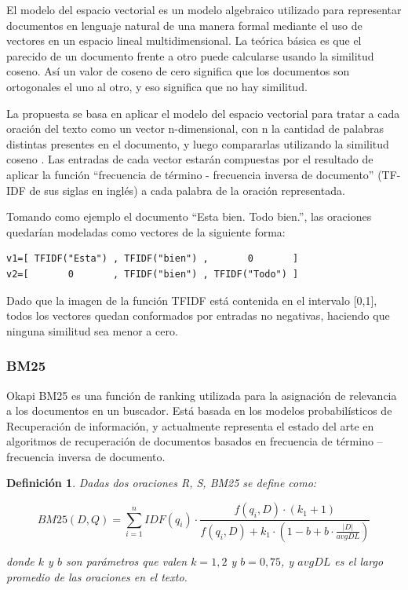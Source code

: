 \documentclass[a4paper]{article}
\newtheorem{definicion}{Definición}
\begin{document}
El modelo del espacio vectorial es un modelo algebraico utilizado para representar documentos en lenguaje natural de una manera formal mediante el uso de vectores en un espacio lineal multidimensional. La teórica básica es que el parecido de un documento frente a otro puede calcularse usando la similitud coseno. Así un valor de coseno de cero significa que los documentos son ortogonales el uno al otro, y eso significa que no hay similitud.

La propuesta se basa en aplicar el modelo del espacio vectorial para tratar a cada oración del texto como un vector n-dimensional, con n la cantidad de palabras distintas presentes en el documento, y luego compararlas utilizando la similitud coseno . Las entradas de cada vector estarán compuestas por el resultado de aplicar la función “frecuencia de término - frecuencia inversa de documento” (TF-IDF de sus siglas en inglés) a cada palabra de la oración representada.

Tomando como ejemplo el documento “Esta bien. Todo bien.”, las oraciones quedarían modeladas como vectores de la siguiente forma:

\begin{Verbatim}[xleftmargin=3em]
v1=[ TFIDF("Esta") , TFIDF("bien") ,       0       ]
v2=[       0       , TFIDF("bien") , TFIDF("Todo") ]
\end{Verbatim}

Dado que la imagen de la función TFIDF está contenida en el intervalo [0,1], todos los vectores quedan conformados por entradas no negativas, haciendo que ninguna similitud sea menor a cero. 


\subsubsection{BM25}
Okapi BM25 es una función de ranking utilizada para la asignación de relevancia a los documentos en un buscador. 
Está basada en los modelos probabilísticos de Recuperación de información, y actualmente 
representa el estado del arte en algoritmos de recuperación de documentos 
basados en frecuencia de término -- frecuencia inversa de documento.

\begin{definicion}
Dadas dos oraciones R, S, BM25 se define como:

\begin{equation}
BM25(D,Q) = \sum_{i=1}^{n} IDF(q_i) \cdot \frac{f(q_i, D) \cdot (k_1 + 1)}{f(q_i, D) + k_1 \cdot (1 - b + b \cdot \frac{|D|}{avgDL})}
\end{equation}

donde $k$ y $b$ son parámetros que valen $k = 1,2$ y $b = 0,75$, y $avgDL$ es el largo promedio de las oraciones en el texto.
\end{definicion}
\end{document}
